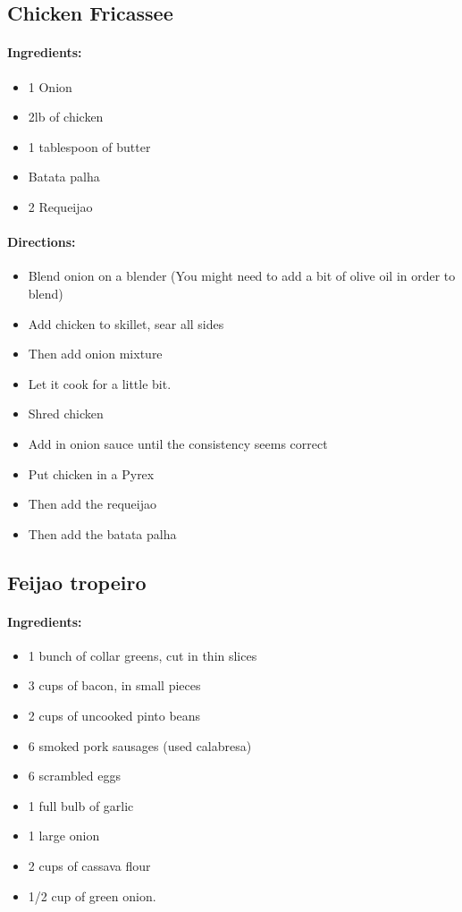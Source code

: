 \documentclass{article}
\begin{document}
\subsection{Chicken Fricassee}

\paragraph{Ingredients:}

\begin{itemize}
	\item 1 Onion
	\item 2lb of chicken
	\item 1 tablespoon of butter
	\item Batata palha
	\item 2 Requeijao
\end{itemize}

\paragraph{Directions:}
\begin{itemize}
	\item Blend onion on a blender (You might need to add a bit of olive oil in order to blend)
	\item Add chicken to skillet, sear all sides
	\item Then add onion mixture
	\item Let it cook for a little bit.
	\item Shred chicken
	\item Add in onion sauce until the consistency seems correct
	\item Put chicken in a Pyrex
	\item Then add the requeijao
	\item Then add the batata palha
\end{itemize}

\subsection{Feijao tropeiro}

\paragraph{Ingredients:}

\begin{itemize}
	\item 1 bunch of collar greens, cut in thin slices
	\item 3 cups of bacon, in small pieces
	\item 2 cups of uncooked pinto beans
	\item 6 smoked pork sausages (used calabresa)
	\item 6 scrambled eggs
	\item 1 full bulb of garlic
	\item 1 large onion
	\item 2 cups of cassava flour
	\item 1/2 cup of green onion.
\end{itemize}
\end{document}
